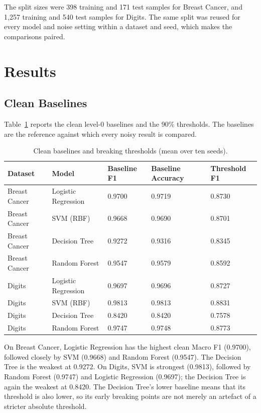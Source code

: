 The split sizes were 398 training and 171 test samples for Breast Cancer, and 1,257 training and 540 test samples for Digits. The same split was reused for every model and noise setting within a dataset and seed, which makes the comparisons paired.

\section{Results}

\subsection{Clean Baselines}

Table~\ref{tab:baselines} reports the clean level-0 baselines and the 90\% thresholds. The baselines are the reference against which every noisy result is compared.

\begin{table}[H]
\centering
\caption{Clean baselines and breaking thresholds (mean over ten seeds).}
\label{tab:baselines}
\small
\begin{tabular}{p{2.3cm}p{3.4cm}p{2.0cm}p{2.4cm}p{2.0cm}}
\toprule
\textbf{Dataset} & \textbf{Model} & \textbf{Baseline F1} & \textbf{Baseline Accuracy} & \textbf{Threshold F1} \\
\midrule
Breast Cancer & Logistic Regression & 0.9700 & 0.9719 & 0.8730 \\
Breast Cancer & SVM (RBF) & 0.9668 & 0.9690 & 0.8701 \\
Breast Cancer & Decision Tree & 0.9272 & 0.9316 & 0.8345 \\
Breast Cancer & Random Forest & 0.9547 & 0.9579 & 0.8592 \\
\midrule
Digits & Logistic Regression & 0.9697 & 0.9696 & 0.8727 \\
Digits & SVM (RBF) & 0.9813 & 0.9813 & 0.8831 \\
Digits & Decision Tree & 0.8420 & 0.8420 & 0.7578 \\
Digits & Random Forest & 0.9747 & 0.9748 & 0.8773 \\
\bottomrule
\end{tabular}
\end{table}

On Breast Cancer, Logistic Regression has the highest clean Macro F1 (0.9700), followed closely by SVM (0.9668) and Random Forest (0.9547). The Decision Tree is the weakest at 0.9272. On Digits, SVM is strongest (0.9813), followed by Random Forest (0.9747) and Logistic Regression (0.9697); the Decision Tree is again the weakest at 0.8420. The Decision Tree's lower baseline means that its threshold is also lower, so its early breaking points are not merely an artefact of a stricter absolute threshold.

